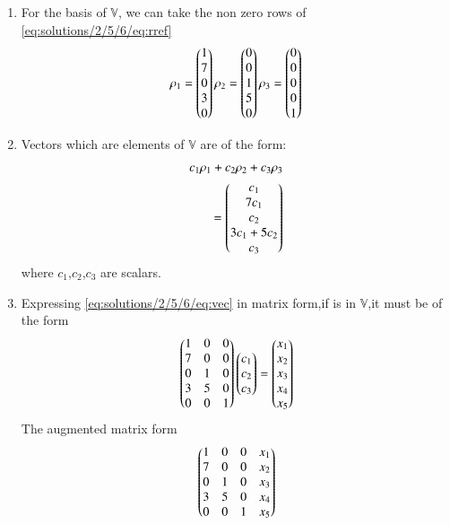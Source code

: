 \begin{enumerate}[label=\alph*.]
\item For the basis of $\mathbb{V}$, we can take the non zero rows of \eqref{eq:solutions/2/5/6/eq:rref} \\
\begin{align}
    \rho_1=\begin{pmatrix}1\\7\\0\\3\\0\end{pmatrix} 
    \rho_2=\begin{pmatrix}0\\0\\1\\5\\0\end{pmatrix}
    \rho_3=\begin{pmatrix}0\\0\\0\\0\\1\end{pmatrix}
\end{align}
\item Vectors which are elements of $\mathbb{V}$  are of the form:
\begin{align}
    c_1\rho_1+c_2\rho_2+c_3\rho_3 \nonumber\\
    =\begin{pmatrix}c_1\\7c_1\\c_2\\3c_1+5c_2\\c_3\end{pmatrix} \label{eq:solutions/2/5/6/eq:vec}
\end{align}
where $c_1$,$c_2$,$c_3$ are scalars.
\item Expressing \eqref{eq:solutions/2/5/6/eq:vec} in matrix form,if  is in $\mathbb{V}$,it must be of the form
\begin{align}
\begin{pmatrix}1&0&0\\7&0&0\\0&1&0\\3&5&0\\0&0&1\end{pmatrix}\begin{pmatrix}c_1\\c_2\\c_3\end{pmatrix} = \begin{pmatrix}x_1\\x_2\\x_3\\x_4\\x_5\end{pmatrix}
\end{align}
The augmented matrix form
\begin{align}
\myvec{1&0&0&x_1\\7&0&0&x_2\\0&1&0&x_3\\3&5&0&x_4\\0&0&1&x_5}

\end{align}
\end{enumerate}
